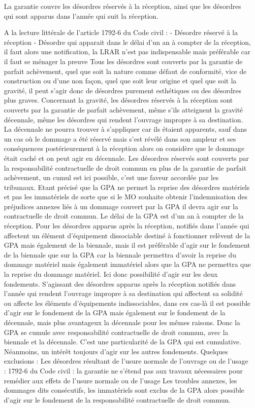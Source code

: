 			La garantie couvre les désordres réservés à la réception, ainsi que les désordres qui sont apparus dans l'année qui suit la réception.

			A la lecture littérale de l’article 1792-6 du Code civil :
			-	Désordre réservé à la réception
			-	Désordre qui apparait dans le délai d’un an à compter de la réception, il faut alors une notification, la LRAR n’est pas indispensable mais préférable car il faut se ménager la preuve
			Tous les désordres sont couverts par la garantie de parfait achèvement, quel que soit la nature comme défaut de conformité, vice de construction ou d’une non façon, quel que soit leur origine et quel que soit la gravité, il peut s’agir donc de désordres purement esthétiques ou des désordres plus graves.
			Concernant la gravité, les désordres réservés à la réception sont couverts par la garantie de parfait achèvement, même s’ils atteignent la gravité décennale, même les désordres qui rendent l’ouvrage impropre à sa destination. La décennale ne pourra trouver à s’appliquer car ils étaient apparents, sauf dans un cas où le dommage a été réservé mais s’est révélé dans son ampleur et ses conséquences postérieurement à la réception alors on considère que le dommage était caché et on peut agir en décennale.
			Les désordres réservés sont couverts par la responsabilité contractuelle de droit commun en plus de la garantie de parfait achèvement, un cumul est ici possible, c’est une faveur accordée par les tribunaux.
			Etant précisé que la GPA ne permet la reprise des désordres matériels et pas les immatériels de sorte que si le MO souhaite obtenir l’indemnisation des préjudices annexes liés à un dommage couvert par la GPA il devra agir sur la contractuelle de droit commun.
			Le délai de la GPA est d’un an à compter de la réception.
			Pour les désordres apparus après la réception, notifiés dans l’année qui affectent un élément d’équipement dissociable destiné à fonctionner relèvent de la GPA mais également de la biennale, mais il est préférable d’agir sur le fondement de la biennale que sur la GPA car la biennale permettra d’avoir la reprise du dommage matériel mais également immatériel alors que la GPA ne permettra que la reprise du dommage matériel. Ici donc possibilité d’agir sur les deux fondements.
			S’agissant des désordres apparus après la réception notifiés dans l’année qui rendent l’ouvrage impropre à sa destination qui affectent sa solidité ou affecte les éléments d’équipements indissociables, dans ces cas-là il est possible d’agir sur le fondement de la GPA mais également sur le fondement de la décennale, mais plus avantageux la décennale pour les mêmes raisons.
			Donc la GPA se cumule avec responsabilité contractuelle de droit commun, avec la biennale et la décennale. C’est une particularité de la GPA qui est cumulative. Néanmoins, un intérêt toujours d’agir sur les autres fondements.
			Quelques exclusions :
			Les désordres résultant de l’usure normale de l’ouvrage ou de l’usage : 1792-6 du Code civil : la garantie ne s’étend pas aux travaux nécessaires pour remédier aux effets de l’usure normale ou de l’usage
			Les troubles annexes, les dommages dits consécutifs, les immatériels sont exclus de la GPA alors possible d’agir sur le fondement de la responsabilité contractuelle de droit commun.

